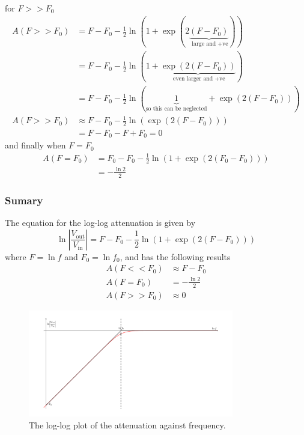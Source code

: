 for $F>>F_0$
\begin{align}
  A(F>>F_0) &= F - F_0  -\frac{1}{2} \ln\left(1+\exp(2\underbrace{(F - F_0)}_{\text{ large and +ve}})\right) \nonumber \\
  &= F - F_0 -\frac{1}{2} \ln\left(1+\underbrace{\exp(2(F - F_0))}_{\text{ even larger and +ve}}\right) \nonumber \\
  &= F - F_0  -\frac{1}{2} \ln\left(\underbrace{1}_{\text{so this can be neglected}}+\exp(2(F - F_0))\right) \nonumber \\
  A(F>>F_0) &\approx F - F_0  -\frac{1}{2} \ln\left(\exp(2(F - F_0))\right) \nonumber \\
  &= F - F_0 -F + F_0 = 0 \label{eq:RL_log_log_large_F}
\end{align}
and finally when $F=F_0$
\begin{align}
  A(F=F_0) &= F_0 - F_0  -\frac{1}{2} \ln\left(1+\exp( 2(F_0 - F_0) )\right) \nonumber \\
  &=  -\frac{\ln 2}{2}  \label{eq:RL_log_log_equal}
\end{align}

\begin{framed}
\subsubsection*{Sumary}
The equation for the log-log attenuation is given by
\begin{equation*}
\ln \left|\frac{V_{\text{out}}}{V_{\text{in}}} \right| = F - F_0  -\frac{1}{2} \ln\left(1+\exp( 2(F - F_0) )\right)
\end{equation*}
where $F=\ln f$ and $F_0 = \ln f_0$, and has the following results
\begin{align*}
   A(F<<F_0) &\approx F - F_0 \\
   A(F=F_0) &= -\frac{\ln 2}{2} \\
   A(F>>F_0) &\approx 0
\end{align*}
\end{framed}
\begin{figure}[h]
  \centering
\includegraphics[width=0.8\textwidth]{img/RL_log_log_plot}
\caption{The log-log plot of the attenuation against frequency.} \label{fig:RL_log_log}
\end{figure}
